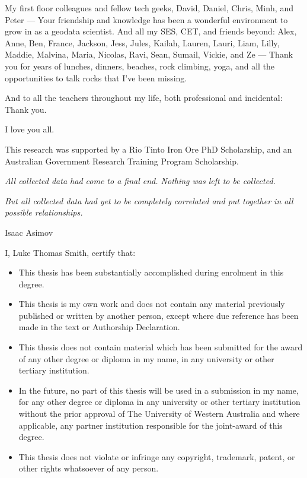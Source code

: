 \documentclass[12pt,a4paper,notitlepage]{report} %
\begin{document}
My first floor colleagues and fellow tech geeks, David, Daniel, Chris, Minh, and Peter --- Your friendship and knowledge has been a wonderful environment to grow in as a geodata scientist.
And all my SES, CET, and friends beyond: Alex, Anne, Ben, France, Jackson, Jess, Jules, Kailah, Lauren, Lauri, Liam, Lilly, Maddie, Malvina, Maria, Nicolas, Ravi, Sean, Sumail, Vickie, and Ze --- Thank you for years of lunches, dinners, beaches, rock climbing, yoga, and all the opportunities to talk rocks that I've been missing.

And to all the teachers throughout my life, both professional and incidental: Thank you.

I love you all.

\smallskip
\medskip
\noindent This research was supported by a Rio Tinto Iron Ore PhD Scholarship, and an Australian Government Research Training Program Scholarship.
\vfill{}

\epigraph{
    \textit{All collected data had come to a final end. Nothing was left to be collected.}

    \smallskip
    \textit{But all collected data had yet to be completely correlated and put together in all possible relationships.}}{Isaac Asimov}


\newpage{}
\tableofcontents{}
\listoffigures{}

\newpage{}
I, Luke Thomas Smith, certify that:
\begin{itemize}
    \item{}This thesis has been substantially accomplished during enrolment in this degree.
    \item{}This thesis is my own work and does not contain any material previously published or written by another person, except where due reference has been made in the text or Authorship Declaration.
    \item{}This thesis does not contain material which has been submitted for the award of any other degree or diploma in my name, in any university or other tertiary institution.
    \item{}In the future, no part of this thesis will be used in a submission in my name, for any other degree or diploma in any university or other tertiary institution without the prior approval of The University of Western Australia and where applicable, any partner institution responsible for the joint-award of this degree.
    \item{}This thesis does not violate or infringe any copyright, trademark, patent, or other rights whatsoever of any person.
\end{itemize}
\end{document}
